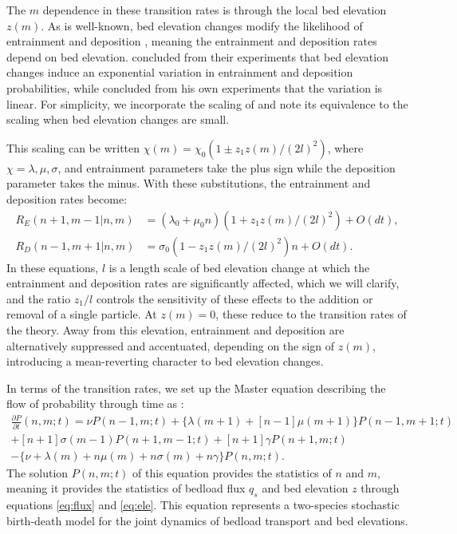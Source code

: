 \documentclass[draft]{agujournal2018}
\begin{document}
The $m$ dependence in these transition rates is through the local bed elevation $z(m)$.
As is well-known, bed elevation changes modify the likelihood of entrainment and deposition \citep{Sawai1987, Wong2007}, meaning the entrainment and deposition rates depend on bed elevation.
\citet{Wong2007} concluded from their experiments that bed elevation changes induce an exponential variation in entrainment and deposition probabilities, while \citet{Sawai1987} concluded from his own experiments that the variation is linear.
For simplicity, we incorporate the scaling of \citet{Sawai1987} and note its equivalence to the \citet{Wong2007} scaling when bed elevation changes are small.

This scaling can be written $\chi(m) = \chi_0(1\pm z_1 z(m)/(2l)^2)$, where $\chi = \lambda, \mu, \sigma$, and entrainment parameters take the plus sign while the deposition parameter takes the minus.
With these substitutions, the entrainment and deposition rates become:
\begin{align}
R_E(n+1,m-1| n,m)  &= (\lambda_0 + \mu_0 n)(1 + z_1z(m)/(2l)^2) + O(dt),\\
R_D(n-1,m+1| n,m) &= \sigma_0 (1-z_1z(m)/(2l)^2)n + O(dt).
\end{align}
In these equations, $l$ is a length scale of bed elevation change at which the entrainment and deposition rates are significantly affected, which we will clarify, and the ratio $z_1/l$ controls the sensitivity of these effects to the addition or removal of a single particle.
At $z(m)=0$, these reduce to the transition rates of the \citet{Ancey2008} theory.
Away from this elevation, entrainment and deposition are alternatively suppressed and accentuated, depending on the sign of $z(m)$, introducing a mean-reverting character to bed elevation changes.

In terms of the transition rates, we set up the Master equation describing the flow of probability through time as \citep[e.g.][]{Cox1965, Gillespie1992, Ancey2008}:
\begin{multline}
 \frac{\partial P}{\partial t}(n,m;t) =  
\nu P(n-1,m;t) + 
\{\lambda(m+1) + [n-1]\mu(m+1)\}P(n-1,m+1;t)\\ + 
[n+1]\sigma(m-1)P(n+1,m-1;t) + 
[n+1]\gamma P(n+1,m;t) \\- 
\{ \nu + \lambda(m) + n\mu(m) + n\sigma(m) + n \gamma \}P(n,m;t).
 \label{eq:master}
\end{multline} 
The solution $P(n,m;t)$ of this equation provides the statistics of $n$ and $m$, meaning it provides the statistics of bedload flux $q_s$ and bed elevation $z$ through equations \ref{eq:flux} and \ref{eq:ele}.
This equation represents a two-species stochastic birth-death model \citep[e.g.][]{Cox1965, Pielou1977} for the joint dynamics of bedload transport and bed elevations.
\end{document}

